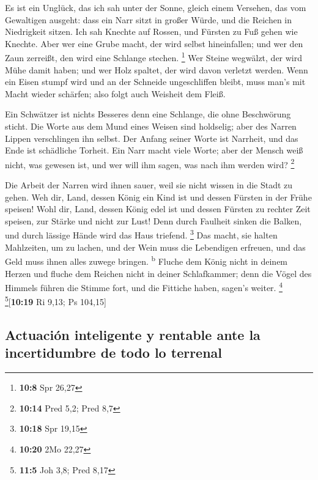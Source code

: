  Es ist ein Unglück, das ich sah unter der Sonne, gleich
einem Versehen, das vom Gewaltigen ausgeht:  dass ein Narr
sitzt in großer Würde, und die Reichen in Niedrigkeit sitzen.
 Ich sah Knechte auf Rossen, und Fürsten zu Fuß gehen wie
Knechte.  Aber wer eine Grube macht, der wird selbst
hineinfallen; und wer den Zaun zerreißt, den wird eine Schlange stechen.
\footnote{\textbf{10:8} Spr 26,27}  Wer Steine wegwälzt,
der wird Mühe damit haben; und wer Holz spaltet, der wird davon verletzt
werden.  Wenn ein Eisen stumpf wird und an der Schneide
ungeschliffen bleibt, muss man's mit Macht wieder schärfen; also folgt
auch Weisheit dem Fleiß.

 Ein Schwätzer ist nichts Besseres denn eine Schlange,
die ohne Beschwörung sticht.  Die Worte aus dem Mund
eines Weisen sind holdselig; aber des Narren Lippen verschlingen ihn
selbst.  Der Anfang seiner Worte ist Narrheit, und das
Ende ist schädliche Torheit.  Ein Narr macht viele Worte;
aber der Mensch weiß nicht, was gewesen ist, und wer will ihm sagen, was
nach ihm werden wird? \footnote{\textbf{10:14} Pred 5,2; Pred 8,7}

 Die Arbeit der Narren wird ihnen sauer, weil sie nicht
wissen in die Stadt zu gehen.  Weh dir, Land, dessen
König ein Kind ist und dessen Fürsten in der Frühe speisen!
 Wohl dir, Land, dessen König edel ist und dessen Fürsten
zu rechter Zeit speisen, zur Stärke und nicht zur Lust! 
Denn durch Faulheit sinken die Balken, und durch lässige Hände wird das
Haus triefend. \footnote{\textbf{10:18} Spr 19,15}  Das
macht, sie halten Mahlzeiten, um zu lachen, und der Wein muss die
Lebendigen erfreuen, und das Geld muss ihnen alles zuwege bringen.
\textsuperscript{b}  Fluche dem König nicht in deinem
Herzen und fluche dem Reichen nicht in deiner Schlafkammer; denn die
Vögel des Himmels führen die Stimme fort, und die Fittiche haben,
sagen's weiter. \footnote{\textbf{10:20} 2Mo 22,27}
\footnote{\textbf{11:5} Joh 3,8; Pred 8,17}{[}\textbf{10:19} Ri 9,13; Ps
104,15{]}

\hypertarget{actuaciuxf3n-inteligente-y-rentable-ante-la-incertidumbre-de-todo-lo-terrenal}{%
\subsection{Actuación inteligente y rentable ante la incertidumbre de
todo lo
terrenal}\label{actuaciuxf3n-inteligente-y-rentable-ante-la-incertidumbre-de-todo-lo-terrenal}}

